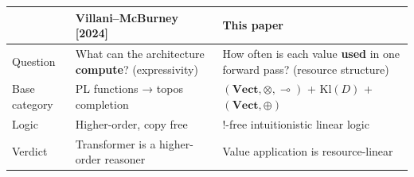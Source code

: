 \documentclass[a4paper,11pt]{article}
\begin{document}
\begin{longtable}[]{@{}lll@{}}
\toprule
\begin{minipage}[b]{0.30\columnwidth}\raggedright
\strut
\end{minipage} & \begin{minipage}[b]{0.30\columnwidth}\raggedright
Villani--McBurney {[}2024{]}\strut
\end{minipage} & \begin{minipage}[b]{0.30\columnwidth}\raggedright
This paper\strut
\end{minipage}\tabularnewline
\midrule
\endhead
\begin{minipage}[t]{0.30\columnwidth}\raggedright
Question\strut
\end{minipage} & \begin{minipage}[t]{0.30\columnwidth}\raggedright
What can the architecture \textbf{compute}? (expressivity)\strut
\end{minipage} & \begin{minipage}[t]{0.30\columnwidth}\raggedright
How often is each value \textbf{used} in one forward pass? (resource
structure)\strut
\end{minipage}\tabularnewline
\begin{minipage}[t]{0.30\columnwidth}\raggedright
Base category\strut
\end{minipage} & \begin{minipage}[t]{0.30\columnwidth}\raggedright
PL functions → topos completion\strut
\end{minipage} & \begin{minipage}[t]{0.30\columnwidth}\raggedright
\((\mathbf{Vect},\otimes,\multimap)\) + \(\mathrm{Kl}(D)\) +
\((\mathbf{Vect},\oplus)\)\strut
\end{minipage}\tabularnewline
\begin{minipage}[t]{0.30\columnwidth}\raggedright
Logic\strut
\end{minipage} & \begin{minipage}[t]{0.30\columnwidth}\raggedright
Higher-order, copy free\strut
\end{minipage} & \begin{minipage}[t]{0.30\columnwidth}\raggedright
\(!\)-free intuitionistic linear logic\strut
\end{minipage}\tabularnewline
\begin{minipage}[t]{0.30\columnwidth}\raggedright
Verdict\strut
\end{minipage} & \begin{minipage}[t]{0.30\columnwidth}\raggedright
Transformer is a higher-order reasoner\strut
\end{minipage} & \begin{minipage}[t]{0.30\columnwidth}\raggedright
Value application is resource-linear\strut
\end{minipage}\tabularnewline
\bottomrule
\end{longtable}
\end{document}
